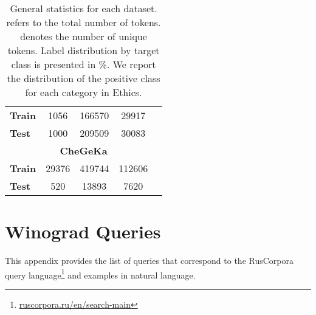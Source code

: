 \documentclass[11pt]{article}
\newcommand{\xmark}{\ding{55}}\newcommand{\cmark}{\ding{51}}
\begin{document}
\begin{table}[h!]
\begin{tabular}{lcccc}
\bf Train & 1056        & 166570   & 29917         &  \xmark                        \\
\bf Test  & 1000        & 209509 & 30083         & \xmark                        \\ \midrule
      \multicolumn{5}{c}{\textbf{CheGeKa}}                                      \\ \midrule
\bf Train & 29376          & 419744    & 112606           & \xmark                        \\
\bf Test  & 520         & 13893  & 7620          & \xmark                        \\ \bottomrule
\end{tabular}
\caption{General statistics for each dataset.  refers to the total number of tokens.  denotes the number of unique tokens. Label distribution by target class is presented in \%. We report the distribution of the positive class for each category in Ethics.}
\label{tab:cumulative_stats}
\end{table}  
\section{Winograd Queries}
\label{app:winograd}
This appendix provides the list of queries that correspond to the RusCorpora query language\footnote{\href{https://ruscorpora.ru/old/en/search-main.html}{ruscorpora.ru/en/search-main}} and examples in natural language. 
\end{document}
